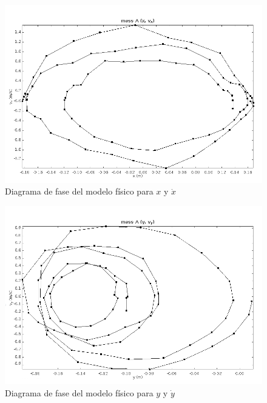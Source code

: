 \begin{figure}[h]
 \centering
 \includegraphics[scale=0.3]{./img/tracker_poc_phasediagram_x_vx.png}
 \caption{Diagrama de fase del modelo físico para $x$ y $\dot{x}$}
 \label{fig: tracker phase diagram x vx}
\end{figure}

\begin{figure}[h]
 \centering
 \includegraphics[scale=0.3]{./img/tracker_poc_phasediagram_y_vy.png}
 \caption{Diagrama de fase del modelo físico para $y$ y $\dot{y}$}
 \label{fig: tracker phase diagram y vy}
\end{figure}
